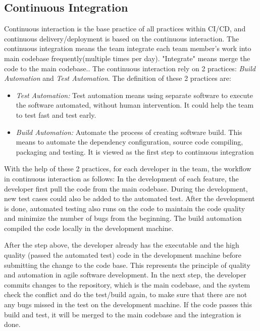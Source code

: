 \subsection{Continuous Integration}
Continuous interaction is the base practice of all practices within CI/CD, and continuous delivery/deployment is based on the continuous interaction.\cite{Continuo67:online}
The continuous integration means the team integrate each team member's work into main codebase frequently(multiple times per day). "Integrate" means merge the code to the main codebase.\cite{fowler2006continuous}. The continuous interaction rely on 2 practices: \textit{Build Automation} and  \textit{Test Automation}. The definition of these 2 practices are:
\begin{itemize}
    \label{TestA}
    \item \textit{Test Automation:} Test automation means using separate software to execute the software automated, without human intervention. It could help the team to test fast and test early. \cite{Testauto48:online}
    \item \textit{Build Automation:} Automate the process of creating software build. This means to automate the dependency configuration, source code compiling, packaging and testing. It is viewed as the first step to continuous integration \cite{Buildaut62:online}
\end{itemize}
With the help of these 2 practices, for each developer in the team, the workflow in continuous interaction as follows:\cite{fowler2006continuous} In the development of each feature, the developer first pull the code from the main codebase. During the development, new test cases could also be added to the automated test. After the development is done, automated testing also runs on the code to maintain the code quality and minimize the number of bugs from the beginning. The build automation compiled the code locally in the development machine. 
\par
After the step above, the developer already has the executable and the high quality (passed the automated test) code in the development machine before submitting the change to the code base. This represents the principle of quality and automation in agile software development. In the next step, the developer commits changes to the repository, which is the main codebase, and the system check the conflict and do the test/build again, to make sure that there are not any bugs missed in the test on the development machine.
If the code passes this build and test, it will be merged to the main codebase and the integration is done.
